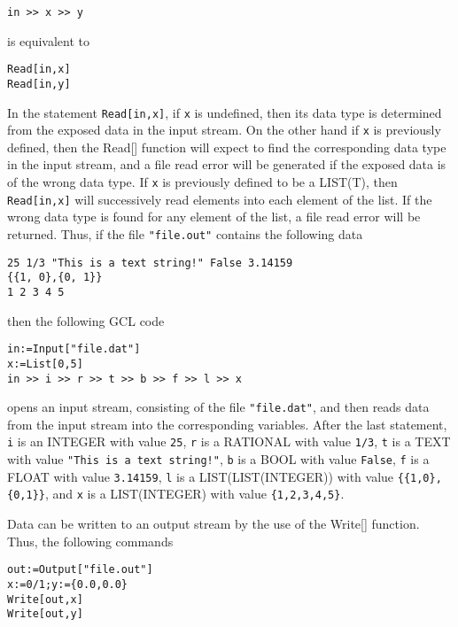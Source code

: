 \begin{verbatim}
in >> x >> y
\end{verbatim}
 
\noindent
is equivalent to 

\begin{verbatim}
Read[in,x]
Read[in,y]
\end{verbatim}

\noindent
In the statement \verb+Read[in,x]+, if \verb+x+ is undefined, then its
data type is determined from the exposed data in the input stream.  On
the other hand if \verb+x+ is previously defined, then the Read[]
function will expect to find the corresponding data type in the input
stream, and a file read error will be generated if the exposed data is
of the wrong data type.  If \verb+x+ is previously defined to be a
LIST(T), then \verb+Read[in,x]+ will successively read elements into
each element of the list.  If the wrong data type is found for any
element of the list, a file read error will be returned.  Thus, if the
file \verb+"file.out"+ contains the following data

\begin{verbatim}
25 1/3 "This is a text string!" False 3.14159 
{{1, 0},{0, 1}}
1 2 3 4 5
\end{verbatim}

then the following GCL code

\begin{verbatim}
in:=Input["file.dat"]
x:=List[0,5]
in >> i >> r >> t >> b >> f >> l >> x
\end{verbatim}

\noindent
opens an input stream, consisting of the file \verb+"file.dat"+, and
then reads data from the input stream into the corresponding
variables.  After the last statement, 
\verb+i+ is an INTEGER with value \verb+25+, 
\verb+r+ is a RATIONAL with value \verb+1/3+, 
\verb+t+ is a TEXT with value \verb+"This is a text string!"+, 
\verb+b+ is a BOOL with value \verb+False+, 
\verb+f+ is a FLOAT with value \verb+3.14159+, 
\verb+l+ is a LIST(LIST(INTEGER)) with value \verb+{{1,0},{0,1}}+, and 
\verb+x+ is a LIST(INTEGER) with value \verb+{1,2,3,4,5}+.  

Data can be written to an output stream by the use of the Write[]
function.  Thus, the following commands

\begin{verbatim}
out:=Output["file.out"]
x:=0/1;y:={0.0,0.0}
Write[out,x]
Write[out,y]
\end{verbatim}

